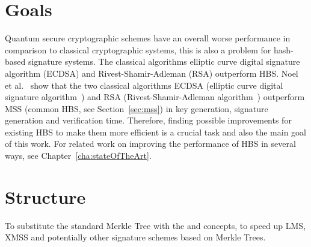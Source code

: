 \section{Goals} 
Quantum secure cryptographic schemes have an overall worse performance in comparison to classical cryptographic systems, %
this is also a problem for hash-based signature systems. The classical algorithms elliptic curve digital signature algorithm (ECDSA) and Rivest-Shamir-Adleman (RSA) outperform HBS. Noel et al.~\cite{comparison_performance_RSA_ECDSA_Merkle_WOTS_2021} show that the two classical algorithms ECDSA (elliptic curve digital signature algorithm~\cite{ecdsa_main_paper_2001}) and RSA (Rivest-Shamir-Adleman algorithm~\cite{rsa_patent}) outperform MSS (common HBS, see Section~\ref{sec:mss}) in key generation, signature generation and verification time.
Therefore, finding possible improvements for existing HBS to make them more efficient is a crucial task and also the main goal of this work.
For related work on improving the performance of HBS in several ways, see Chapter~\ref{cha:stateOfTheArt}.

\section{Structure}
To substitute the standard Merkle Tree with the \tftree and \extree concepts, to speed up LMS, XMSS and potentially other signature schemes based on Merkle Trees.

